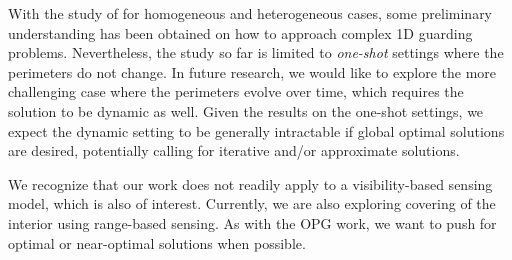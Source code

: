 With the study of \opg \cite{fenghangaoyu2019efficient} for homogeneous and 
heterogeneous cases, some preliminary understanding has been 
obtained on how to approach complex 1D guarding problems. 
Nevertheless, the study so far is limited to {\em one-shot} settings
where the perimeters do not change. In future research, we would like 
to explore the more challenging case where the perimeters evolve 
over time, which requires the solution to be dynamic as well. Given 
the results on the one-shot settings, we expect the dynamic setting
to be generally intractable if global optimal solutions are desired, 
potentially calling for iterative and/or approximate solutions. 

We recognize that our work 
does not readily apply to a visibility-based sensing model, which is also 
of interest. Currently, we are also exploring covering of the interior
using range-based sensing. As with the OPG work, we want to push for 
optimal or near-optimal solutions when possible.
\vspace*{-1mm}
